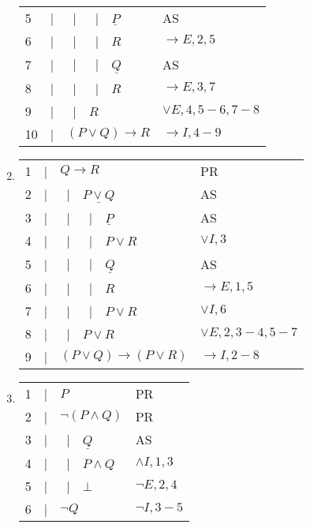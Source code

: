 \documentclass{article}
\newcommand{\asbar}{\ |\ \ }
\begin{document}
\begin{enumerate}
\begin{tabular}{llp{5cm}l}
              5  & | & \asbar \asbar $\underline{P}$       & AS                 \\
              6  & | & \asbar \asbar $R$                   & $\to E,2,5$        \\
              7  & | & \asbar \asbar $\underline{Q}$       & AS                 \\
              8  & | & \asbar \asbar $R$                   & $\to E,3,7$        \\
              9  & | & \asbar $R$                          & $\lor E,4,5-6,7-8$ \\
              10 & | & $ (P\lor Q) \to R$                  & $\to I,4-9$        \\
              \hline
          \end{tabular}
    \item

          \begin{tabular}{llp{5cm}l}
              1 & | & \underline{$Q\to R$}          & PR                 \\
              2 & | & \asbar $\underline{P\lor Q}$  & AS                 \\
              3 & | & \asbar \asbar $\underline{P}$ & AS                 \\
              4 & | & \asbar \asbar $P\lor R$       & $\lor I,3$         \\
              5 & | & \asbar \asbar $\underline{Q}$ & AS                 \\
              6 & | & \asbar \asbar $R$             & $\to E,1,5$        \\
              7 & | & \asbar \asbar $P\lor R$       & $\lor I,6$         \\
              8 & | & \asbar $P\lor R$              & $\lor E,2,3-4,5-7$ \\
              9 & | & $(P\lor Q)\to (P\lor R)$      & $\to I,2-8$        \\
              \hline
          \end{tabular}

    \item

          \begin{tabular}{llp{5cm}l}
              1 & | & \underline{$P$}              & PR            \\
              2 & | & \underline{$\neg(P\land Q)$} & PR            \\
              3 & | & \asbar $\underline{Q}$       & AS            \\
              4 & | & \asbar $P\land Q$            & $\land I,1,3$ \\
              5 & | & \asbar $\bot$                & $\neg E,2,4$  \\
              6 & | & $\neg Q$                     & $\neg I,3-5$  \\
              \hline
          \end{tabular}


\end{enumerate}
\end{document}
